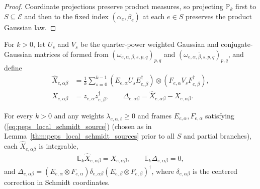 \begin{proof}\leanok
    Coordinate projections preserve product measures, so projecting $\mathbb P_k$ first to $S\subseteq\mathcal E$ and then to the fixed index $(\alpha_e,\beta_e)$ at each $e\in S$ preserves the product Gaussian law.
\end{proof}

\begin{definition}
    \label{def:peps_sampled_source_matrix}
    \leanok
    For $k>0$, let $U_s$ and $V_s$ be the quarter-power weighted Gaussian and conjugate-Gaussian matrices of \cite[Equation~(5.6)]{OpenAI2026PolynomialPEPS} formed from $(\omega_{e,\alpha,\beta,s,p,q})_{p,q}$ and $(\overline{\omega_{e,\alpha,\beta,s,p,q}})_{p,q}$, and define
    \begin{align}
        \widehat X_{e,\alpha\beta}
         & =\frac1k\sum_{s=0}^{k-1}
        (E_{e,\alpha}U_sE_{e,\beta}^{\dagger})
        \otimes(F_{e,\alpha}V_sF_{e,\beta}^{\dagger}), \\
        X_{e,\alpha\beta}
         & =z_{e,\alpha}z_{e,\beta}^{\dagger},\qquad
        \Delta_{e,\alpha\beta}=\widehat X_{e,\alpha\beta}-X_{e,\alpha\beta}.
    \end{align}
\end{definition}

\begin{lemma}
    \label{thm:peps_unbiased_original_sources}
    \leanok
    For every $k>0$ and any weights $\lambda_{e,\alpha,t}\ge 0$ and frames $E_{e,\alpha},F_{e,\alpha}$ satisfying (\ref{eq:peps_local_schmidt_source}) (chosen as in Lemma~\ref{thm:peps_local_schmidt_sources} prior to all $S$ and partial branches), each $\widehat X_{e,\alpha\beta}$ is integrable,
    \begin{align}
        \mathbb E_k\widehat X_{e,\alpha\beta}=X_{e,\alpha\beta},
        \qquad \mathbb E_k\Delta_{e,\alpha\beta}=0,
    \end{align}
    and $\Delta_{e,\alpha\beta}=(E_{e,\alpha}\otimes F_{e,\alpha})\delta_{e,\alpha\beta}(E_{e,\beta}\otimes F_{e,\beta})^{\dagger}$, where $\delta_{e,\alpha\beta}$ is the centered correction in Schmidt coordinates.
\end{lemma}


